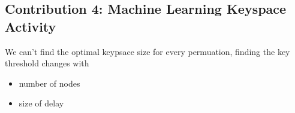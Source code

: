 \subsection{Contribution 4: Machine Learning Keyspace Activity}

We can't find the optimal keypsace size for every permuation, finding the key threshold changes with
\begin{itemize}
  \item number of nodes
  \item size of delay
\end{itemize}


%
%
%
%
%
%
%
%
%
%
%
%
%
